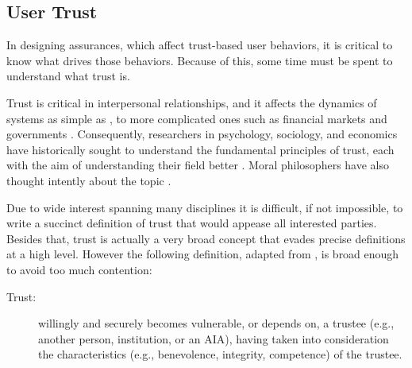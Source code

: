 \subsection{User Trust} \label{sec:trust}
    In designing assurances, which affect trust-based user behaviors, it is critical to know what drives those behaviors. Because of this, some time must be spent to understand what trust is. 

    Trust is critical in interpersonal relationships, and it affects the dynamics of  systems as simple as   \cite{Lewicki2006-hj}, to more complicated ones such as financial markets and governments \cite{Fukuyama1995-un}. Consequently, researchers in psychology, sociology, and economics have historically sought to understand the fundamental principles of trust, each with the aim of understanding their field better \cite{Gambetta1988-pi}. Moral philosophers have also thought intently about the topic \cite{Baier1986-im}.

    Due to wide interest spanning many disciplines it is difficult, if not impossible, to write a succinct definition of trust that would appease all interested parties. Besides that, trust is actually a very broad concept that evades precise definitions at a high level. However the following definition, adapted from \cite{McKnight2004-vv}, is broad enough to avoid too much contention:

    \begin{description}
        \item [Trust:]  willingly and securely becomes vulnerable, or depends on, a trustee (e.g., another person, institution, or an AIA), having taken into consideration the characteristics (e.g., benevolence, integrity, competence) of the trustee.
    \end{description}


